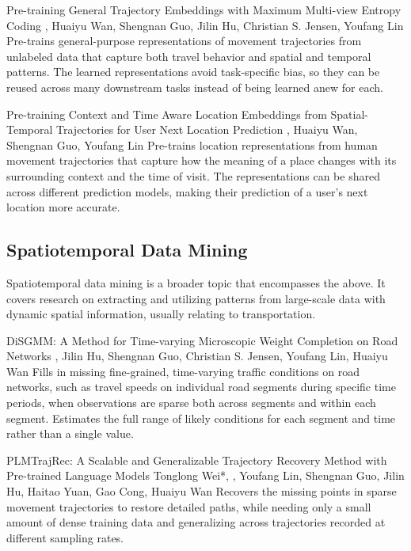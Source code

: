 {Pre-training General Trajectory Embeddings with Maximum Multi-view Entropy Coding}
{\me, Huaiyu Wan, Shengnan Guo, Jilin Hu, Christian S. Jensen, Youfang Lin}
{Pre-trains general-purpose representations of movement trajectories from unlabeled data that capture both travel behavior and spatial and temporal patterns. The learned representations avoid task-specific bias, so they can be reused across many downstream tasks instead of being learned anew for each.}

{Pre-training Context and Time Aware Location Embeddings from Spatial-Temporal Trajectories for User Next Location Prediction}
{\me, Huaiyu Wan, Shengnan Guo, Youfang Lin}
{Pre-trains location representations from human movement trajectories that capture how the meaning of a place changes with its surrounding context and the time of visit. The representations can be shared across different prediction models, making their prediction of a user's next location more accurate.}

\subsection*{Spatiotemporal Data Mining}
Spatiotemporal data mining is a broader topic that encompasses the above. It covers research on extracting and utilizing patterns from large-scale data with dynamic spatial information, usually relating to transportation.

{DiSGMM: A Method for Time-varying Microscopic Weight Completion on Road Networks}
{\me, Jilin Hu, Shengnan Guo, Christian S. Jensen, Youfang Lin, Huaiyu Wan}
{Fills in missing fine-grained, time-varying traffic conditions on road networks, such as travel speeds on individual road segments during specific time periods, when observations are sparse both across segments and within each segment. Estimates the full range of likely conditions for each segment and time rather than a single value.}

{PLMTrajRec: A Scalable and Generalizable Trajectory Recovery Method with Pre-trained Language Models}
{Tonglong Wei*, \me*, Youfang Lin, Shengnan Guo, Jilin Hu, Haitao Yuan, Gao Cong, Huaiyu Wan}
{Recovers the missing points in sparse movement trajectories to restore detailed paths, while needing only a small amount of dense training data and generalizing across trajectories recorded at different sampling rates.}


